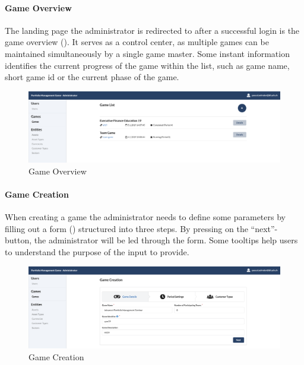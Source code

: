 \paragraph{Game Overview}
The landing page the administrator is redirected to after a successful login is the game overview (). It serves as a control center, as multiple games can be maintained simultaneously by a single game master. Some instant information identifies the current progress of the game within the list, such as game name, short game id or the current phase of the game.
\begin{figure}[h!]
  \centering
  \includegraphics[scale=0.2]{img/application-overview/administrator/02_game_overview.png}
  \caption{Game Overview}
  \label{fig:game_overview}
\end{figure}

\paragraph{Game Creation}
When creating a game the administrator needs to define some parameters by filling out a form () structured into three steps. By pressing on the ``next''-button, the administrator will be led through the form. Some tooltips help users to understand the purpose of the input to provide.
\begin{figure}[h!]
  \centering
  \includegraphics[scale=0.2]{img/application-overview/administrator/03_game_creation.png}
  \caption{Game Creation}
  \label{fig:game_creation}
\end{figure}

